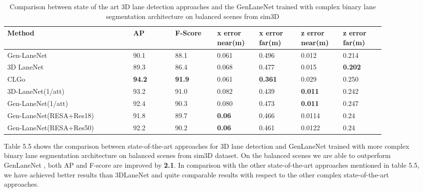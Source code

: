     \begin{table}[htbp]
    \addtolength{\tabcolsep}{-1pt}
    \begin{center}
    \caption{Comparison between state of the art 3D lane detection approaches and the GenLaneNet \cite{guo2020gen} trained with complex binary lane segmentation architecture on balanced scenes from sim3D \cite{guo2020gen}}
    \begin{tabular}{|p{0.3\linewidth}|p{0.1\linewidth}|p{0.1\linewidth}|p{0.1\linewidth}|p{0.1\linewidth}|p{0.1\linewidth}|p{0.1\linewidth}|}
    \hline
        \textbf{Method} & \textbf{AP} & \textbf{F-Score} & \textbf{x error near(m)} & \textbf{x error far(m)} & \textbf{z error near(m)} & \textbf{z error far(m)} \\ \hline
        Gen-LaneNet\cite{guo2020gen} & 90.1 & 88.1 & 0.061 & 0.496 & 0.012 & 0.214 \\ \hline
        3D LaneNet \cite{DBLP:journals/corr/abs-1811-10203}& 89.3 & 86.4 & 0.068 & 0.477 & 0.015 & \textbf{0.202} \\ \hline
        CLGo \cite{DBLP:journals/corr/abs-2112-15351}& \textbf{94.2} &\textbf{ 91.9} & 0.061 & \textbf{0.361} & 0.029 & 0.250 \\ \hline
        3D-LaneNet(1/att) \cite{9506296} &  93.2 & 91.0 & 0.082 & 0.439 & \textbf{0.011} & 0.242 \\ \hline
        Gen-LaneNet(1/att) \cite{9506296}& 92.4 & 90.3 & 0.080 & 0.473 & \textbf{0.011} & 0.247 \\ \hline
        Gen-LaneNet(RESA+Res18) & 91.8 & 89.7 & \textbf{0.06} & 0.466 & 0.0114 & 0.24 \\ \hline
        Gen-LaneNet(RESA+Res50) & 92.2 & 90.2 &\textbf{ 0.06} & 0.461 & 0.0122 & 0.24 \\ \hline
    \end{tabular}
    \end{center}
    \end{table}
    
    Table 5.5 shows the comparison between state-of-the-art approaches for 3D lane detection and GenLaneNet \cite{guo2020gen} trained with more complex binary lane segmentation architecture on balanced scenes from sim3D dataset\cite{guo2020gen}. On the balanced scenes we are able to outperform GenLaneNet \cite{guo2020gen}, both AP and F-score are improved by \textbf{2.1}. In comparison with the other state-of-the-art approaches mentioned in table 5.5, we have achieved better results than 3DLaneNet \cite{DBLP:journals/corr/abs-1811-10203} and quite comparable results with respect to the other complex state-of-the-art approaches. 
        

